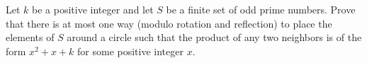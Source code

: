 Let $k$ be a positive integer and let $S$ be a finite set of odd prime numbers. Prove that there is at most one way (modulo rotation and reflection) to place the elements of $S$ around a circle such that the product of any two neighbors is of the form $x^2 + x + k$ for some positive integer $x$.
